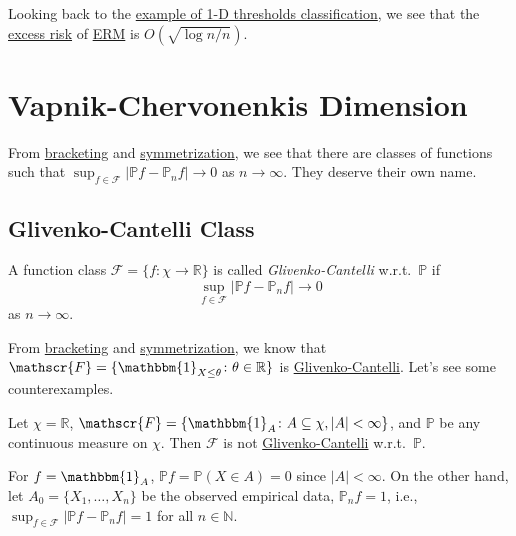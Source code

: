 \begin{remark}
	Looking back to the \hyperref[eg:1D-classification-thresholds]{example of 1-D thresholds classification}, we see that the \hyperref[not:excess-risk]{excess risk} of \hyperref[prb:ERM]{ERM} is \(O(\sqrt{\log n / n} )\).
\end{remark}

\section{Vapnik-Chervonenkis Dimension}
From \hyperref[prop:bracketing]{bracketing} and \hyperref[prop:symmetrization]{symmetrization}, we see that there are classes of functions such that \(\sup _{f\in \mathscr{F} } \left\vert \mathbb{P} f - \mathbb{P} _n f \right\vert \to 0\) as \(n \to \infty \). They deserve their own name.

\subsection{Glivenko-Cantelli Class}
\begin{definition}\label{def:Glivenko-Cantelli}
	A function class \(\mathscr{F} = \{ f\colon \chi \to \mathbb{R} \} \) is called \emph{Glivenko-Cantelli} w.r.t.\ \(\mathbb{P} \) if
	\[
		\sup _{f\in \mathscr{F} } \left\vert \mathbb{P} f - \mathbb{P} _n f \right\vert \to 0
	\]
	as \(n \to \infty \).
\end{definition}

From \hyperref[prop:bracketing]{bracketing} and \hyperref[prop:symmetrization]{symmetrization}, we know that \(\mathscr{F} = \{ \mathbbm{1}_{X \leq \theta } \colon \theta \in \mathbb{R} \} \) is \hyperref[def:Glivenko-Cantelli]{Glivenko-Cantelli}. Let's see some counterexamples.

\begin{eg}
	Let \(\chi = \mathbb{R} \), \(\mathscr{F} = \{ \mathbbm{1}_{A} \colon A \subseteq \chi, \vert A \vert < \infty \} \), and \(\mathbb{P} \) be any continuous measure on \(\chi \). Then \(\mathscr{F} \) is not \hyperref[def:Glivenko-Cantelli]{Glivenko-Cantelli} w.r.t.\ \(\mathbb{P} \).
\end{eg}
\begin{explanation}
	For \(f = \mathbbm{1}_{A} \), \(\mathbb{P} f = \mathbb{P} (X\in A) = 0\) since \(\vert A \vert < \infty \). On the other hand, let \(A_0 = \{ X_1, \dots , X_n \} \) be the observed empirical data, \(\mathbb{P} _n f = 1\), i.e., \(\sup _{f\in \mathscr{F} } \vert \mathbb{P} f - \mathbb{P} _n f \vert = 1\) for all \(n\in \mathbb{N} \).
\end{explanation}

